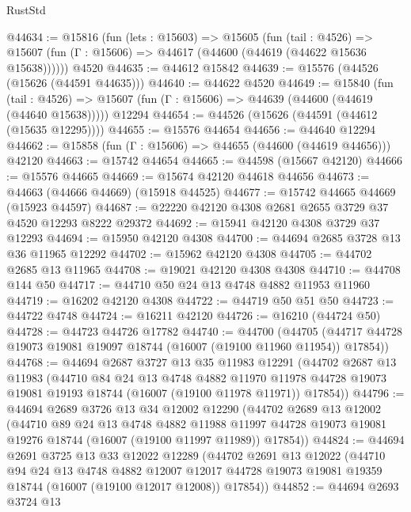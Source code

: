 \begin{lexlean}{RustStd}
\begin{coremodule}
@44634 := @15816
    (fun (lets : @15603) =>
    @15605
      (fun (tail : @4526) =>
      @15607 (fun (Γ : @15606) => @44617 (@44600 (@44619 (@44622 @15636 @15638))))))
    @4520
@44635 := @44612 @15842
@44639 := @15576 (@44526 (@15626 (@44591 @44635)))
@44640 := @44622 @4520
@44649 := @15840
    (fun (tail : @4526) => @15607 (fun (Γ : @15606) => @44639 (@44600 (@44619 (@44640 @15638)))))
    @12294
@44654 := @44526 (@15626 (@44591 (@44612 (@15635 @12295))))
@44655 := @15576 @44654
@44656 := @44640 @12294
@44662 := @15858 (fun (Γ : @15606) => @44655 (@44600 (@44619 @44656))) @42120
@44663 := @15742 @44654
@44665 := @44598 (@15667 @42120)
@44666 := @15576 @44665
@44669 := @15674 @42120 @44618 @44656
@44673 := @44663 (@44666 @44669) (@15918 @44525)
@44677 := @15742 @44665 @44669 (@15923 @44597)
@44687 := @22220 @42120 @4308 @2681 @2655 @3729 @37 @4520 @12293 @8222 @29372
@44692 := @15941 @42120 @4308 @3729 @37 @12293
@44694 := @15950 @42120 @4308
@44700 := @44694 @2685 @3728 @13 @36 @11965 @12292
@44702 := @15962 @42120 @4308
@44705 := @44702 @2685 @13 @11965
@44708 := @19021 @42120 @4308 @4308
@44710 := @44708 @144 @50
@44717 := @44710 @50 @24 @13 @4748 @4882 @11953 @11960
@44719 := @16202 @42120 @4308
@44722 := @44719 @50 @51 @50
@44723 := @44722 @4748
@44724 := @16211 @42120
@44726 := @16210 (@44724 @50)
@44728 := @44723 @44726 @17782
@44740 := @44700
    (@44705 (@44717 @44728 @19073 @19081 @19097 @18744 (@16007 (@19100 @11960 @11954)) @17854))
@44768 := @44694
    @2687
    @3727
    @13
    @35
    @11983
    @12291
    (@44702
      @2687
      @13
      @11983
      (@44710
        @84
        @24
        @13
        @4748
        @4882
        @11970
        @11978
        @44728
        @19073
        @19081
        @19193
        @18744
        (@16007 (@19100 @11978 @11971))
        @17854))
@44796 := @44694
    @2689
    @3726
    @13
    @34
    @12002
    @12290
    (@44702
      @2689
      @13
      @12002
      (@44710
        @89
        @24
        @13
        @4748
        @4882
        @11988
        @11997
        @44728
        @19073
        @19081
        @19276
        @18744
        (@16007 (@19100 @11997 @11989))
        @17854))
@44824 := @44694
    @2691
    @3725
    @13
    @33
    @12022
    @12289
    (@44702
      @2691
      @13
      @12022
      (@44710
        @94
        @24
        @13
        @4748
        @4882
        @12007
        @12017
        @44728
        @19073
        @19081
        @19359
        @18744
        (@16007 (@19100 @12017 @12008))
        @17854))
@44852 := @44694
    @2693
    @3724
    @13

\end{coremodule}
\end{lexlean}
